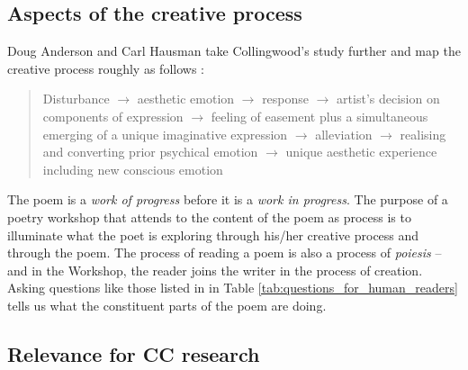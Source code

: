 %

\subsection{Aspects of the creative process}

Doug Anderson and Carl Hausman take Collingwood's study further and map the
creative process roughly as follows \cite[pp. 299-305]{anderson1992role}:

\begin{quote}
Disturbance $\rightarrow$ aesthetic emotion $\rightarrow$ response $\rightarrow$ artist's decision on components of expression $\rightarrow$ feeling of easement plus a simultaneous emerging of a unique imaginative expression $\rightarrow$ alleviation $\rightarrow$ realising and converting prior psychical emotion $\rightarrow$ unique aesthetic experience including new conscious emotion 
\end{quote}

The poem is a \emph{work of progress} before it is a \emph{work in progress}.
%
The purpose of a poetry workshop that attends to the content of the poem as process is to illuminate what the poet is exploring through his/her creative process and through the poem. The process
of reading a poem is also a process of \emph{poiesis} -- and in the Workshop, the reader joins the writer in the process of creation.  Asking questions like those listed in in Table \ref{tab:questions_for_human_readers} 
tells us what the constituent parts of the poem are doing.

\subsection{Relevance for CC research}

